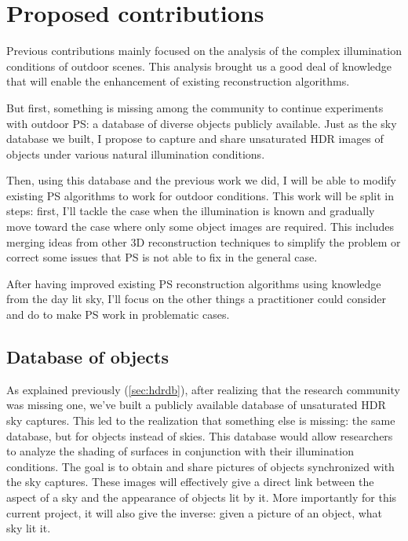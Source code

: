 
\chapter{Proposed contributions}

Previous contributions mainly focused on the analysis of the complex illumination conditions of outdoor scenes. This analysis brought us a good deal of knowledge that will enable the enhancement of existing reconstruction algorithms.

But first, something is missing among the community to continue experiments with outdoor PS: a database of diverse objects publicly available. Just as the sky database we built, I propose to capture and share unsaturated HDR images of objects under various natural illumination conditions.

Then, using this database and the previous work we did, I will be able to modify existing PS algorithms to work for outdoor conditions. This work will be split in steps: first, I'll tackle the case when the illumination is known and gradually move toward the case where only some object images are required. This includes merging ideas from other 3D reconstruction techniques to simplify the problem or correct some issues that PS is not able to fix in the general case.

After having improved existing PS reconstruction algorithms using knowledge from the day lit sky, I'll focus on the other things a practitioner could consider and do to make PS work in problematic cases.


\section{Database of objects}

As explained previously (\ref{sec:hdrdb}), after realizing that the research community was missing one, we've built a publicly available database of unsaturated HDR sky captures. This led to the realization that something else is missing: the same database, but for objects instead of skies. This database would allow researchers to analyze the shading of surfaces in conjunction with their illumination conditions. The goal is to obtain and share pictures of objects synchronized with the sky captures. These images will effectively give a direct link between the aspect of a sky and the appearance of objects lit by it. More importantly for this current project, it will also give the inverse: given a picture of an object, what sky lit it.

